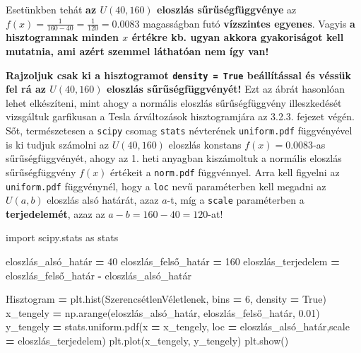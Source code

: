 \documentclass[
]{book}
\newenvironment{Shaded}{\begin{snugshade}}{\end{snugshade}}
\newcommand{\DecValTok}[1]{\textcolor[rgb]{0.00,0.00,0.81}{#1}}
\newcommand{\FloatTok}[1]{\textcolor[rgb]{0.00,0.00,0.81}{#1}}
\newcommand{\ImportTok}[1]{#1}
\newcommand{\NormalTok}[1]{#1}
\newcommand{\OperatorTok}[1]{\textcolor[rgb]{0.81,0.36,0.00}{\textbf{#1}}}
\newcommand{\VariableTok}[1]{\textcolor[rgb]{0.00,0.00,0.00}{#1}}
\begin{document}
Esetünkben tehát \textbf{az \(U(40,160)\) eloszlás sűrűségfüggvénye} az \(f(x)=\frac{1}{160-40}=\frac{1}{120}=0.0083\) magasságban futó \textbf{vízszintes egyenes}. Vagyis \textbf{a hisztogramnak minden \(x\) értékre kb. ugyan akkora gyakoriságot kell mutatnia, ami azért szemmel láthatóan nem így van!}

\textbf{Rajzoljuk csak ki a hisztogramot \texttt{density\ =\ True} beállítással és véssük fel rá az \(U(40,160)\) eloszlás sűrűségfüggvényét!} Ezt az ábrát hasonlóan lehet elkészíteni, mint ahogy a normális eloszlás sűrűségfüggvény illeszkedését vizsgáltuk garfikusan a Tesla árváltozások hisztogramjára az 3.2.3. fejezet végén.
Sőt, természetesen a \texttt{scipy} csomag \texttt{stats} névterének \texttt{uniform.pdf} függvényével is ki tudjuk számolni az \(U(40,160)\) eloszlás konstans \(f(x)=0.0083\)-as sűrűségfüggvényét, ahogy az 1. heti anyagban kiszámoltuk a normális eloszlás sűrűségfüggvény \(f(x)\) értékeit a \texttt{norm.pdf} függvénnyel. Arra kell figyelni az \texttt{uniform.pdf} függvénynél, hogy a \texttt{loc} nevű paraméterben kell megadni az \(U(a,b)\) eloszlás alsó határát, azaz \(a\)-t, míg a \texttt{scale} paraméterben a \textbf{terjedelemét}, azaz az \(a-b=160-40=120\)-at!

\begin{Shaded}
\begin{Highlighting}[]
\ImportTok{import}\NormalTok{ scipy.stats }\ImportTok{as}\NormalTok{ stats}

\NormalTok{eloszlás\_alsó\_határ }\OperatorTok{=} \DecValTok{40}
\NormalTok{eloszlás\_felső\_határ }\OperatorTok{=} \DecValTok{160}
\NormalTok{eloszlás\_terjedelem }\OperatorTok{=}\NormalTok{ eloszlás\_felső\_határ }\OperatorTok{{-}}\NormalTok{ eloszlás\_alsó\_határ}

\NormalTok{Hisztogram }\OperatorTok{=}\NormalTok{ plt.hist(SzerencsétlenVéletlenek, bins }\OperatorTok{=} \DecValTok{6}\NormalTok{, density }\OperatorTok{=} \VariableTok{True}\NormalTok{)}
\NormalTok{x\_tengely }\OperatorTok{=}\NormalTok{ np.arange(eloszlás\_alsó\_határ, eloszlás\_felső\_határ, }\FloatTok{0.01}\NormalTok{)}
\NormalTok{y\_tengely }\OperatorTok{=}\NormalTok{ stats.uniform.pdf(x }\OperatorTok{=}\NormalTok{ x\_tengely, loc }\OperatorTok{=}\NormalTok{ eloszlás\_alsó\_határ,scale }\OperatorTok{=}\NormalTok{ eloszlás\_terjedelem)}
\NormalTok{plt.plot(x\_tengely, y\_tengely)}
\NormalTok{plt.show()}
\end{Highlighting}
\end{Shaded}
\end{document}
